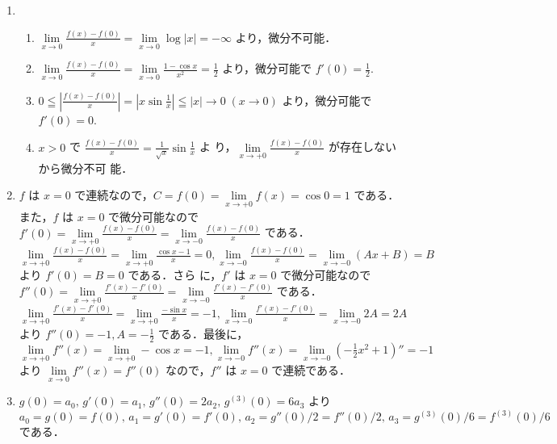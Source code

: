 \documentclass[11pt, uplatex, dvipdfmx, twoside]{jsarticle}
\renewcommand{\dlim}{\lim\limits} %
\begin{document}
\begin{enumerate}[label=\ref{sec:derivative}.\arabic*]
  \setlength{\itemsep}{1ex}
  
\item
  \begin{enumerate}[label=(\arabic*)]
    \setlength{\itemsep}{1ex}
    
  \item
    $\dlim_{x \to 0} \frac{f(x)-f(0)}{x} = \dlim_{x \to 0}\log|x|
    =-\infty$ より，微分不可能．
    
  \item
    $\dlim_{x \to 0} \frac{f(x)-f(0)}{x} = \dlim_{x \to 0}
    \frac{1-\cos x}{x^2}=\frac{1}{2}$ より，微分可能で $f'(0) =
    \frac{1}{2}$.
    
  \item
    $0 \leqq \left| \frac{f(x)-f(0)}{x}\right| = \left| x \sin
      \frac{1}{x}\right| \leqq |x| \to 0 \; (x \to 0)$ より，微分可能で $f'(0)=0$.
    
  \item $x>0$ で 
    $\frac{f(x)-f(0)}{x} = \frac{1}{\sqrt{x}} \sin \frac{1}{x}$ よ
    り，$\dlim_{x \to +0} \frac{f(x)-f(0)}{x}$ が存在しないから微分不可
    能．
  \end{enumerate}

\item $f$ は $x=0$ で連続なので，$C= f(0) = \dlim_{x \to +0} f(x) =
  \cos 0=1$ である．また，$f$ は $x=0$ で微分可能なので
  $f'(0) = \dlim_{x \to +0} \frac{f(x)-f(0)}{x} = \dlim_{x \to -0}
  \frac{f(x)-f(0)}{x}$
  である．$\dlim_{x \to +0} \frac{f(x)-f(0)}{x} = \dlim_{x \to +0}
  \frac{\cos x -1}{x} = 0, \dlim_{x \to -0} \frac{f(x)-f(0)}{x} =
  \dlim_{x \to -0} (Ax+B) = B$ より $f'(0) = B = 0$ である．さら
  に，$f'$ は $x=0$ で微分可能なので
  $f''(0) = \dlim_{x \to +0} \frac{f'(x)-f'(0)}{x} = \dlim_{x \to -0}
  \frac{f'(x)-f'(0)}{x}$
  である．$\dlim_{x \to +0} \frac{f'(x)-f'(0)}{x} = \dlim_{x \to
    +0}\frac{-\sin x}{x}=-1, \dlim_{x \to -0}
  \frac{f'(x)-f'(0)}{x}=\dlim_{x \to -0}2A = 2A$ より
  $f''(0)=-1, A=-\frac{1}{2}$
  である．最後に，$\dlim_{x \to +0} f''(x) = \dlim_{x \to +0} -\cos x
  = -1, \dlim_{x \to -0} f''(x) = \dlim_{x \to -0}
  \left(-\frac{1}{2}x^2+1\right)'' = -1$ より
  $\dlim_{x \to 0} f''(x) = f''(0)$ なので，$f''$ は $x=0$ で連続である．

\item $g(0)=a_0, \, g'(0)=a_1, \, g''(0)=2a_2, \,
  g^{(3)}(0)=6a_3$ より
  $a_0=g(0)=f(0), \, a_1= g'(0) = f'(0), \, a_2 = g''(0)/2 = f''(0)/2,
  \, a_3=g^{(3)}(0)/6=f^{(3)}(0)/6$ である．
  \begin{enumerate}[label=(\arabic*)]
    \setlength{\itemsep}{1ex}
    

\end{enumerate}
\end{enumerate}
\end{document}
